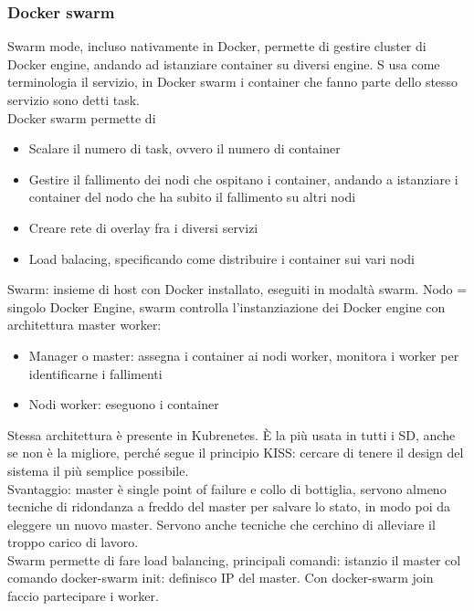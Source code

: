 \documentclass{article}
\begin{document}
\subsubsection{Docker swarm}
Swarm mode, incluso nativamente in Docker, permette di gestire cluster di Docker engine, andando ad istanziare container su diversi engine. S usa come terminologia il servizio, in Docker swarm i container che fanno parte dello stesso servizio sono detti task.\\ Docker swarm permette di
\begin{itemize}
\item Scalare il numero di task, ovvero il numero di container
\item Gestire il fallimento dei nodi che ospitano i container, andando a istanziare i container del nodo che ha subito il fallimento su altri nodi
\item Creare rete di overlay fra i diversi servizi
\item Load balacing, specificando come distribuire i container sui vari nodi
\end{itemize}
Swarm: insieme di host con Docker installato, eseguiti in modaltà swarm. Nodo = singolo Docker Engine, swarm controlla l'instanziazione dei Docker engine con architettura master worker:
\begin{itemize}
\item Manager o master: assegna i container ai nodi worker, monitora i worker per identificarne i fallimenti
\item Nodi worker: eseguono i container
\end{itemize}
Stessa architettura è presente in Kubrenetes. È la più usata in tutti i SD, anche se non è la migliore, perché segue il principio KISS: cercare di tenere il design del sistema il più semplice possibile.\\ Svantaggio: master è single point of failure e collo di bottiglia, servono almeno tecniche di ridondanza a freddo del master per salvare lo stato, in modo poi da eleggere un nuovo master. Servono anche tecniche che cerchino di alleviare il troppo carico di lavoro.\\ Swarm permette di fare load balancing, principali comandi: istanzio il master col comando docker-swarm init: definisco IP del master. Con docker-swarm join faccio partecipare i worker.
\end{document}
